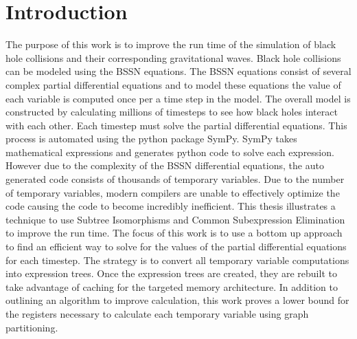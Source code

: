 \documentclass[10pt, conference]{IEEEtran} %
\begin{document}

%
\IEEEpeerreviewmaketitle

\section{Introduction}
The purpose of this work is to improve the run time of the simulation of black hole collisions and their corresponding gravitational waves. Black hole collisions can be modeled using the BSSN equations. The BSSN equations consist of several complex partial differential equations and to model these equations the value of each variable is computed once per a time step in the model. The overall model is constructed by calculating millions of timesteps to see how black holes interact with each other. Each timestep must solve the partial differential equations. This process is automated using the python package SymPy. SymPy takes mathematical expressions and generates python code to solve each expression. However due to the complexity of the BSSN differential equations, the auto generated code consists of thousands of temporary variables. Due to the number of temporary variables, modern compilers are unable to effectively optimize the code causing the code to become incredibly inefficient. This thesis illustrates a technique to use Subtree Isomorphisms and Common Subexpression Elimination to improve the run time.
The focus of this work is to use a bottom up approach to find an efficient way to solve for the values of the partial differential equations for each timestep. The strategy is to convert all temporary variable computations into expression trees. Once the expression trees are created, they are rebuilt to take advantage of caching for the targeted memory architecture. In addition to outlining an algorithm to improve calculation, this work proves a lower bound for the registers necessary to calculate each temporary variable using graph partitioning.
\end{document}
